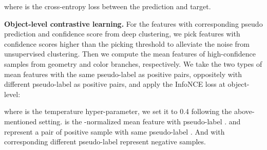 \documentclass{article}
\begin{document}
where  is the cross-entropy loss between the prediction and target. 

\textbf{Object-level contrastive learning.} For the features  with corresponding pseudo prediction  and confidence score from deep clustering, we pick features with confidence scores higher than the picking threshold to alleviate the noise from unsupervised clustering. Then we compute the mean features of high-confidence samples from geometry and color branches, respectively. We take the two types of mean features with the same pseudo-label as positive pairs, oppositely with different pseudo-label as positive pairs, and apply the InfoNCE loss at object-level:

where  is the temperature hyper-parameter, we set it to 0.4 following the above-mentioned setting.  is the -normalized mean feature with pseudo-label .  and  represent a pair of positive sample with same pseudo-label . And  with  corresponding different pseudo-label  represent negative samples.
\end{document}
